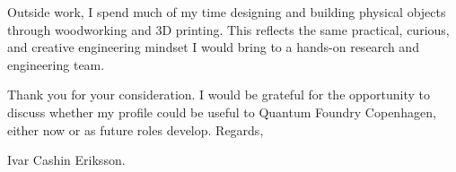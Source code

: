 \documentclass[11pt,a4paper]{moderncv}
\begin{document}
\hspace*{2em}
Outside work, I spend much of my time designing and building physical objects through woodworking and 3D printing. This reflects the same practical, curious, and creative engineering mindset I would bring to a hands-on research and engineering team.

\vspace*{2em}
Thank you for your consideration. I would be grateful for the opportunity to discuss whether my profile could be useful to Quantum Foundry Copenhagen, either now or as future roles develop. Regards,

\vspace*{1em}
Ivar Cashin Eriksson.
\end{document}
